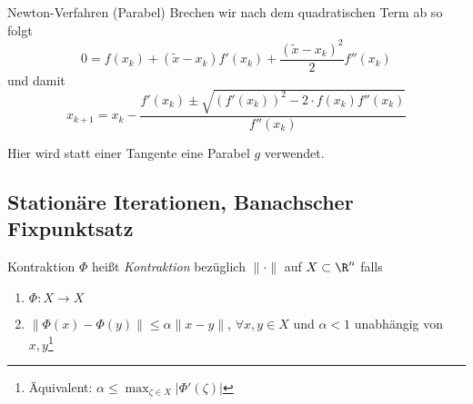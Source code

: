 \begin{bonus}{Newton-Verfahren (Parabel)}
    Brechen wir nach dem quadratischen Term ab so folgt
    \[
        0 = f(x_k) + (\tilde{x} - x_k) f'(x_k) + \frac{(\tilde{x} - x_k)^2}{2} f''(x_k)
    \]
    und damit
    \[
        x_{k+1} = x_k - \frac{f'(x_k) \pm \sqrt{(f'(x_k))^2 - 2 \cdot f(x_k) f''(x_k)}}{f''(x_k)}
    \]
    
    Hier wird statt einer Tangente eine Parabel $g$ verwendet.
\end{bonus}

\subsection{Stationäre Iterationen, Banachscher Fixpunktsatz}


\begin{defi}{Kontraktion}
    $\Phi$ heißt \emph{Kontraktion} bezüglich $\| \cdot \|$ auf $X \subset \R^n$ falls
    \begin{enumerate}
        \item $\Phi: X \to X$
        \item $\|\Phi(x) - \Phi(y)\| \leq \alpha \|x-y\|$, $\forall x, y \in X$ und $\alpha < 1$ unabhängig von $x, y$\footnote{Äquivalent: $\displaystyle \alpha \leq \max_{\zeta \in X} |\Phi'(\zeta)|$}
    \end{enumerate}
\end{defi}

